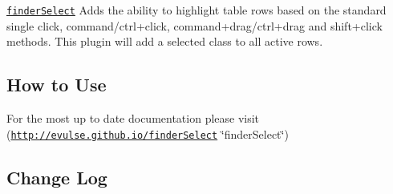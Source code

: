 \href{http://github.com/evulse/finderselect}{\tt finder\+Select} Adds the ability to highlight table rows based on the standard single click, command/ctrl+click, command+drag/ctrl+drag and shift+click methods. This plugin will add a {\ttfamily selected} class to all active rows.

\subsection*{How to Use}

For the most up to date documentation please visit (\href{http://evulse.github.io/finderSelect}{\tt http\+://evulse.\+github.\+io/finder\+Select} \char`\"{}finder\+Select\char`\"{})

\subsection*{Change Log}


